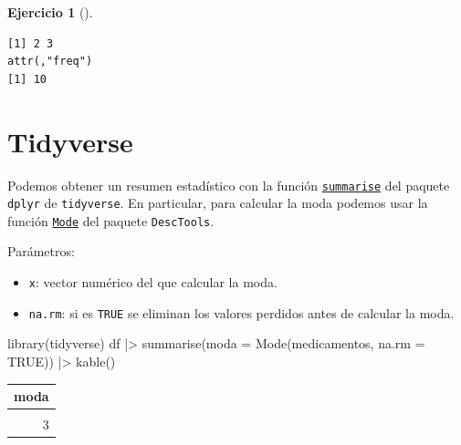 \documentclass[
  a4paper,
]{scrreport}
\newenvironment{Shaded}{\begin{snugshade}}{\end{snugshade}}
\newcommand{\AttributeTok}[1]{\textcolor[rgb]{0.40,0.45,0.13}{#1}}
\newcommand{\ConstantTok}[1]{\textcolor[rgb]{0.56,0.35,0.01}{#1}}
\newcommand{\FunctionTok}[1]{\textcolor[rgb]{0.28,0.35,0.67}{#1}}
\newcommand{\NormalTok}[1]{\textcolor[rgb]{0.00,0.23,0.31}{#1}}
\newcommand{\SpecialCharTok}[1]{\textcolor[rgb]{0.37,0.37,0.37}{#1}}
\providecommand{\tightlist}{%
  \setlength{\itemsep}{0pt}\setlength{\parskip}{0pt}}\usepackage{longtable,booktabs,array}
\theoremstyle{definition}
\newtheorem{exercise}{Ejercicio}[chapter]
\theoremstyle{remark}
\begin{document}
\begin{exercise}[]
\begin{enumerate}
\begin{tcolorbox}
\begin{Shaded}
\end{Shaded}

\begin{verbatim}
[1] 2 3
attr(,"freq")
[1] 10
\end{verbatim}

  \section{Tidyverse}

  Podemos obtener un resumen estadístico con la función
  \href{https://dplyr.tidyverse.org/reference/summarise.html}{\texttt{summarise}}
  del paquete \texttt{dplyr} de \texttt{tidyverse}. En particular, para
  calcular la moda podemos usar la función
  \href{https://www.rdocumentation.org/packages/DescTools/versions/0.99.0/topics/Mode}{\texttt{Mode}}
  del paquete \texttt{DescTools}.

  Parámetros:

  \begin{itemize}
  \tightlist
  \item
    \texttt{x}: vector numérico del que calcular la moda.
  \item
    \texttt{na.rm}: si es \texttt{TRUE} se eliminan los valores perdidos
    antes de calcular la moda.
  \end{itemize}

\begin{Shaded}
\begin{Highlighting}[]
\FunctionTok{library}\NormalTok{(tidyverse) }
\NormalTok{df }\SpecialCharTok{|\textgreater{}} \FunctionTok{summarise}\NormalTok{(}\AttributeTok{moda =} \FunctionTok{Mode}\NormalTok{(medicamentos, }\AttributeTok{na.rm =} \ConstantTok{TRUE}\NormalTok{)) }\SpecialCharTok{|\textgreater{}}
    \FunctionTok{kable}\NormalTok{()}
\end{Highlighting}
\end{Shaded}

  \begin{longtable}[]{@{}r@{}}
  \toprule\noalign{}
  moda \\
  \midrule\noalign{}
  \endhead
  \bottomrule\noalign{}
  \endlastfoot
  2 \\
  3 \\
  \end{longtable}


\end{tcolorbox}
\end{enumerate}
\end{exercise}
\end{document}

